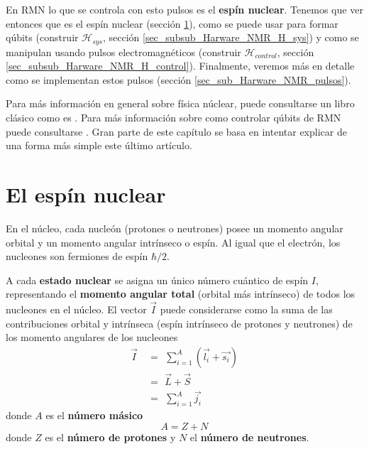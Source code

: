 \documentclass[a4paper,11pt]{book} %
\numberwithin{equation}{chapter}
\begin{document}
En RMN lo que se controla con esto pulsos es el \textbf{espín nuclear}. Tenemos que ver entonces que es el espín nuclear (sección \ref{sec_sub_Harware_NMR_espin}), como se puede usar para formar qúbits (construir $\mathcal{H}_{sys}$, sección \ref{sec_subsub_Harware_NMR_H_sys}) y como se  manipulan usando pulsos electromagnéticos (construir $\mathcal{H}_{control}$, sección \ref{sec_subsub_Harware_NMR_H_control}). Finalmente, veremos más en detalle como se implementan estos pulsos (sección \ref{sec_sub_Harware_NMR_pulsos}).

Para más información en general sobre física núclear, puede consultarse un libro clásico como es \cite{bib_Krane:359790}. Para más información sobre como controlar qúbits de RMN puede consultarse \cite{bib_NMR_hardware}. Gran parte de este capítulo se basa en intentar explicar de una forma más simple este último artículo.



		\section{El espín nuclear} \label{sec_sub_Harware_NMR_espin}

En el núcleo, cada nucleón (protones o neutrones) posee un momento angular orbital y un momento angular intrínseco o espín. Al igual que el electrón, los nucleones son fermiones de espín $\hbar/2$. 

A cada \textbf{estado nuclear} se asigna un único número cuántico de espín $I$, representando el \textbf{momento angular total} (orbital más intrínseco) de todos los nucleones en el núcleo. El vector $\vec{I}$ puede considerarse como la suma de las contribuciones orbital y intrínseca (espín intrínseco de protones y neutrones) de los momento angulares de los nucleones
\begin{equation} \label{ec_Hardware_NMR_I}
\begin{aligned} 
\vec{I} ~ & =  ~ \, \sum_{i=1}^A (\vec{l_i} +  \vec{s_i}) \nonumber \\
& = ~ \,  \vec{L} + \vec{S}  \\
& = ~ \, \sum_{i=1}^A \vec{j_i} \nonumber
\end{aligned}
\end{equation}
donde $A$ es el \textbf{número másico} 
	\begin{equation}
	A = Z + N 
	\end{equation}
donde $Z$ es el \textbf{número de protones} y $N$ el \textbf{número de neutrones}.
\end{document}
